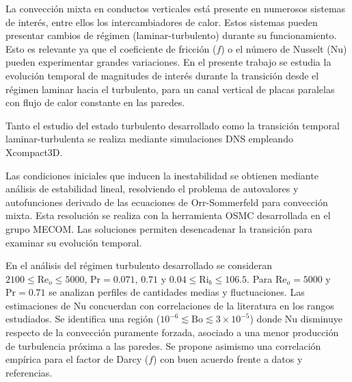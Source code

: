 \begin{resumen}%


La convección mixta en conductos verticales está presente en numerosos sistemas de interés, entre ellos los intercambiadores de calor. Estos sistemas pueden presentar cambios de régimen (laminar-turbulento) durante su funcionamiento. Esto es relevante ya que el coeficiente de fricción ($f$) o el número de Nusselt (Nu) pueden experimentar grandes variaciones. En el presente trabajo se estudia la evolución temporal de magnitudes de interés durante la transición desde el régimen laminar hacia el turbulento, para un canal vertical de placas paralelas con flujo de calor constante en las paredes.


Tanto el estudio del estado turbulento desarrollado como la transición temporal laminar-turbulenta se realiza mediante simulaciones DNS empleando Xcompact3D. %



Las condiciones iniciales que inducen la inestabilidad se obtienen mediante análisis de estabilidad lineal, resolviendo el problema de autovalores y autofunciones derivado de las ecuaciones de Orr-Sommerfeld para convección mixta. Esta resolución se realiza con la herramienta OSMC desarrollada en el grupo MECOM. Las soluciones permiten desencadenar la transición para examinar su evolución temporal. %


En el análisis del régimen turbulento desarrollado se consideran $2100 \leq \mathrm{Re}_o \leq 5000$, $\mathrm{Pr}=0\text{.}071,\,0\text{.}71$ y $0\text{.}04 \leq \mathrm{Ri}_b \leq 106\text{.}5$. Para $\mathrm{Re}_o=5000$ y $\mathrm{Pr}=0\text{.}71$ se \linebreak analizan perfiles de cantidades medias y fluctuaciones. Las estimaciones de Nu concuerdan con correlaciones de la literatura en los rangos estudiados. Se identifica una región ($10^{-6} \lesssim \text{Bo} \lesssim 3 \times 10^{-5}$) donde Nu disminuye respecto de la convección puramente forzada, asociado a una menor producción de turbulencia próxima a las  paredes. Se propone asimismo una correlación empírica para el factor de Darcy ($f$) con buen acuerdo frente a datos y referencias.



\end{resumen}
